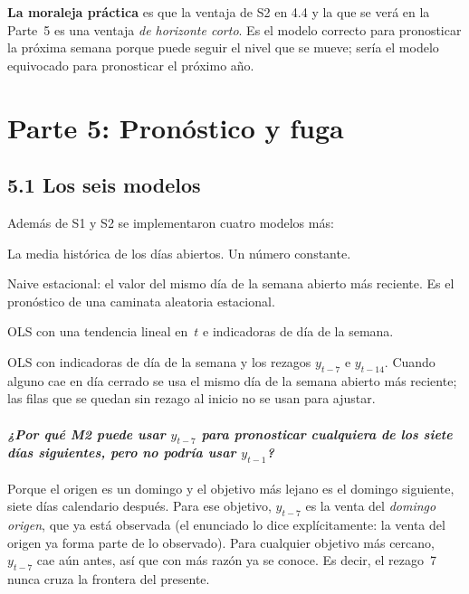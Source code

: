 \documentclass[11pt]{article}
\begin{document}
\textbf{La moraleja pr\'actica} es que la ventaja de S2 en 4.4 y la que se
ver\'a en la Parte~5 es una ventaja \emph{de horizonte corto}. Es el modelo
correcto para pronosticar la pr\'oxima semana porque puede seguir el nivel
que se mueve; ser\'ia el modelo equivocado para pronosticar el pr\'oximo
a\~no.

\section{Parte 5: Pron\'ostico y fuga}

\subsection{5.1 Los seis modelos}

Adem\'as de S1 y S2 se implementaron cuatro modelos m\'as:
\begin{description}[leftmargin=2.6em,style=nextline,nosep]
  \item[B1] La media hist\'orica de los d\'ias abiertos. Un n\'umero
  constante.
  \item[B2] Naive estacional: el valor del mismo d\'ia de la semana abierto
  m\'as reciente. Es el pron\'ostico de una caminata aleatoria estacional.
  \item[M1] OLS con una tendencia lineal en~$t$ e indicadoras de d\'ia de la
  semana.
  \item[M2] OLS con indicadoras de d\'ia de la semana y los rezagos
  $y_{t-7}$ e $y_{t-14}$. Cuando alguno cae en d\'ia cerrado se usa el mismo
  d\'ia de la semana abierto m\'as reciente; las filas que se quedan sin
  rezago al inicio no se usan para ajustar.
\end{description}

\paragraph{{\normalfont\itshape ¿Por qu\'e M2 puede usar $y_{t-7}$ para
pronosticar cualquiera de los siete d\'ias siguientes, pero no podr\'ia usar
$y_{t-1}$?}} Porque el origen es un domingo y el objetivo m\'as lejano es el
domingo siguiente, siete d\'ias calendario despu\'es. Para ese objetivo,
$y_{t-7}$ es la venta del \emph{domingo origen}, que ya est\'a observada
(el enunciado lo dice expl\'icitamente: la venta del origen ya forma parte de
lo observado). Para cualquier objetivo m\'as cercano, $y_{t-7}$ cae a\'un
antes, as\'i que con m\'as raz\'on ya se conoce. Es decir, el rezago~7 nunca
cruza la frontera del presente.
\end{document}
